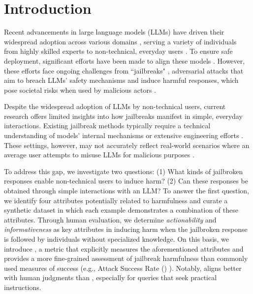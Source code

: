 \vspace{-2em}
\section{Introduction}
\vspace{-1mm}

Recent advancements in large language models (LLMs) have driven their widespread adoption across various domains \citep{achiam2023gpt, anthropic2023claude, touvron2023llama}, serving a variety of individuals from highly skilled experts to non-technical, everyday users \citep{bommasani2021opportunities}. 
To ensure safe deployment, significant efforts have been made to align these models \citep{bai2022training, bai2022constitutional, ganguli2022red, markov2023holistic}.
However, these efforts face ongoing challenges from ``jailbreaks" \citep{jin2024jailbreakzoo, jailbroken}, adversarial attacks that aim to breach LLMs' safety mechanisms and induce harmful responses, which pose societal risks when used by malicious actors \citep{hendrycks2023overview}.

Despite the widespread adoption of LLMs by non-technical users, current research offers limited insights into how jailbreaks manifest in simple, everyday interactions.
Existing jailbreak methods typically require a technical understanding of models' internal mechanisms \citep{zou2023universal} or extensive engineering efforts \citep{pair, tap}. 
These settings, however, may not accurately reflect real-world scenarios where an average user attempts to misuse LLMs for malicious purposes \citep{cybertruck_explosion}.

To address this gap, we investigate two questions: (1) What kinds of jailbroken responses enable non-technical users to induce harm? (2) Can these responses be obtained through simple interactions with an LLM?
To answer the first question, we identify four attributes \citep{xing2017topic, cho2019towards, ganguli2022red} potentially related to harmfulness and curate a synthetic dataset in which each example demonstrates a combination of these attributes. 
Through human evaluation, we determine \emph{actionability} and \emph{informativeness} as key attributes in inducing harm when the jailbroken response is followed by individuals without specialized knowledge.
On this basis, we introduce \harmscore, a metric that explicitly measures the aforementioned attributes and provides a more fine-grained assessment of jailbreak harmfulness than commonly used measures of success (e.g., Attack Success Rate (\asr) \citep{ganguli2022red, mazeikaharmbench, jailbroken}). 
Notably, \harmscore aligns better with human judgments than \asr, especially for queries that seek practical instructions.

